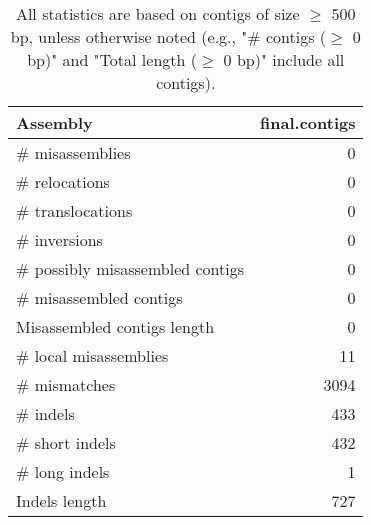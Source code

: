 \documentclass[12pt,a4paper]{article}
\begin{document}
\begin{table}[ht]
\begin{center}
\caption{All statistics are based on contigs of size $\geq$ 500 bp, unless otherwise noted (e.g., "\# contigs ($\geq$ 0 bp)" and "Total length ($\geq$ 0 bp)" include all contigs).}
\begin{tabular}{|l*{1}{|r}|}
\hline
Assembly & final.contigs \\ \hline
\# misassemblies & 0 \\ \hline
\hspace{5mm}\# relocations & 0 \\ \hline
\hspace{5mm}\# translocations & 0 \\ \hline
\hspace{5mm}\# inversions & 0 \\ \hline
\# possibly misassembled contigs & 0 \\ \hline
\# misassembled contigs & 0 \\ \hline
Misassembled contigs length & 0 \\ \hline
\# local misassemblies & 11 \\ \hline
\# mismatches & 3094 \\ \hline
\# indels & 433 \\ \hline
\hspace{5mm}\# short indels & 432 \\ \hline
\hspace{5mm}\# long indels & 1 \\ \hline
Indels length & 727 \\ \hline
\end{tabular}
\end{center}
\end{table}
\end{document}
